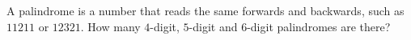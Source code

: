 A palindrome is a number that reads the same forwards and backwards, such as $11211$ or $12321$. How many $4$-digit, $5$-digit and $6$-digit palindromes are there?
